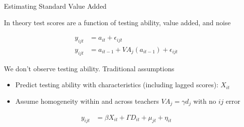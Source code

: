 \documentclass[t,aspectratio=169,11pt]{beamer}
\newenvironment{wideitemize}{\itemize\addtolength{\itemsep}{14pt}}{\enditemize}
\begin{document}
\begin{frame}{Estimating Standard  Value Added}

\begin{wideitemize}
    \item In theory test scores are a function of testing ability, value added, and noise
    
    \begin{align*}
    y_{ijt}  &= a_{it} + \epsilon_{ijt} \\
    y_{ijt}  &= a_{it-1} + VA_j(a_{it-1}) + \epsilon_{ijt}
    \end{align*}
 
    \item We don't observe testing ability. Traditional assumptions
    \begin{itemize}
        \item Predict testing ability with characteristics (including lagged scores): $X_{it}$
        \item Assume homogeneity within and across teachers $VA_j=\gamma d_j$ with no $ij$ error
    \end{itemize}
        
    \begin{align*}
    y_{ijt}  &= \beta X_{it} +\Gamma D_{it} +\mu_{jt} + \eta_{it}
    \end{align*}
    
    \item {}
       
    
\end{wideitemize}
\end{frame}


\end{document}
